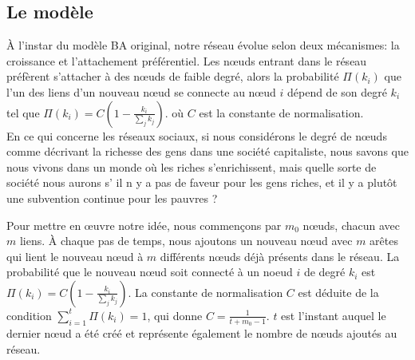    \subsection{Le modèle}
À l'instar du modèle BA original, notre réseau évolue selon deux mécanismes: la croissance et l'attachement préférentiel. Les nœuds entrant dans le réseau préfèrent s'attacher à des nœuds de faible degré, alors la probabilité $\Pi(k_i)$ que l'un des liens d'un nouveau nœud se connecte au nœud $i$ dépend de son degré $k_i$ tel que $\Pi(k_i)=C(1-\frac{k_i}{\sum_jk_j})$. où $C$ est la constante de normalisation.\\
En ce qui concerne les réseaux sociaux, si nous considérons le degré de nœuds comme décrivant la richesse des gens dans une société capitaliste, nous savons que nous vivons dans un monde où les riches s'enrichissent, mais quelle sorte de société nous aurons s' il n y a pas de faveur pour les gens riches, et il y a plutôt une subvention continue pour les pauvres ?
   
   Pour mettre en œuvre notre idée, nous commençons par $m_0$ nœuds, chacun avec $m$ liens. À chaque pas de temps, nous ajoutons un nouveau nœud avec $m$ arêtes qui lient le nouveau nœud à $m$ différents nœuds déjà présents dans le réseau. La probabilité que le nouveau nœud soit connecté à un noeud $i$ de degré $k_i$ est $\Pi(k_i)=C(1-\frac{k_i}{\sum_jk_j})$. La constante de normalisation $C$ est déduite de la condition $\sum_{i=1}^{t}\Pi(k_i)=1$, qui donne $C=\frac{1}{t+m_0-1}$. $t$ est l'instant auquel le dernier nœud a été créé et représente également le nombre de nœuds ajoutés au réseau.
   

